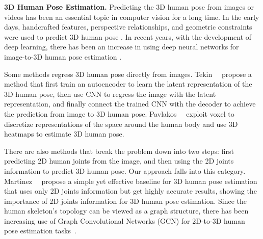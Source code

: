 \documentclass[final]{cvpr}
\begin{document}
\textbf{3D Human Pose Estimation.}
Predicting the 3D human pose from images or videos has been an essential topic in computer vision for a long time.
In the early days, handcrafted features, perspective relationships, and geometric constraints were used to predict 3D human pose \cite{TAKANO2015116, ohashi18iros, 1542030, 6126500}.
In recent years, with the development of deep learning, there has been an increase in using deep neural networks for image-to-3D human pose estimation \cite{BMVC2016_130, tekin2017learning, pavlakos17volumetric, sun2017, yang2018, AAAI18_fang_3dpose}. 

Some methods regress 3D human pose directly from images.
Tekin~\etal~\cite{BMVC2016_130} propose a method that first train an autoencoder to learn the latent representation of the 3D human pose, then use CNN to regress the image with the latent representation, and finally connect the trained CNN with the decoder to achieve the prediction from image to 3D human pose.
Pavlakos~\etal~\cite{pavlakos17volumetric} exploit voxel to discretize representations of the space around the human body and use 3D heatmaps to estimate 3D human pose.

There are also methods that break the problem down into two steps: 
first predicting 2D human joints from the image, and then using the 2D joints information to predict 3D human pose.
Our approach falls into this category.
Martinez~\etal~\cite{Martinez2017ASY} propose a simple yet effective baseline for 3D human pose estimation that uses only 2D joints information but get highly accurate results, showing the importance of 2D joints information for 3D human pose estimation.
Since the human skeleton's topology can be viewed as a graph structure, there has been increasing use of Graph Convolutional Networks (GCN) for 2D-to-3D human pose estimation tasks~\cite{zhaoCVPR19semantic,wang2019gcn,Liu2020}.
\end{document}
